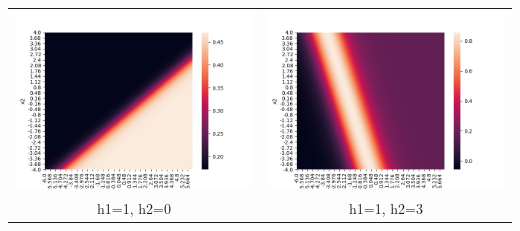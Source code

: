 \documentclass[twoside]{article}
\begin{document}
\begin{tabular}{ cc } 
	\includegraphics[scale=0.5]{heatmaps1/A1_0} & \includegraphics[scale=0.5]{heatmaps1/A1_3} \\ 
	h1=1, h2=0 & h1=1, h2=3 \\ 

\end{tabular}
\end{document}
